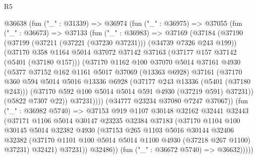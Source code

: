 \begin{lexlean}{R5}
\begin{coremodule}
      @36638
        (fun ("_" : @31339) =>
        @36974
          (fun ("_" : @36975) =>
          @37055
            (fun ("_" : @36673) =>
            @37133
              (fun ("_" : @36983) =>
              @37169
                (@37184
                  (@37190
                    (@37199 (@37211 (@37221 (@37230 @37231))) (@34739 @7326 @243 @199))
                    (@37170
                      @358
                      @1164
                      @5014
                      @37072
                      @37142
                      @37163
                      (@37177 @157 @37142 (@5401 (@37180 @157)))
                      (@37170
                        @1162
                        @100
                        @37070
                        @5014
                        @37161
                        @4930
                        (@5377
                          @37152
                          @162
                          @1161
                          @5017
                          @37069
                          (@13363 @6928)
                          @37161
                          (@37170
                            @360
                            @594
                            @5014
                            @5016
                            @13336
                            @6928
                            (@37177 @243 @13336 (@5401 (@37180 @243)))
                            (@37170 @592 @100 @5014 @5014 @591 @4930 (@37219 @591) @37231))
                          (@5822 @7307 @22))
                        @37231))))
                (@34777 @23234 @37080 @7247 @37067))
              (fun ("_" : @36982 @5740) =>
              @37153
                @919
                @1107
                @30148
                @32162
                @32441
                @32443
                (@37171
                  @1106
                  @5014
                  @30147
                  @23235
                  @32384
                  @37183
                  (@37170
                    @1104
                    @100
                    @30145
                    @5014
                    @32382
                    @4930
                    (@37153
                      @265
                      @1103
                      @5016
                      @30144
                      @32406
                      @32382
                      (@37170 @1101 @100 @5014 @5014 @1100 @4930 (@37218 @267 @1100) @37231)
                      @32421)
                    @37231))
                @32486))
            (fun ("_" : @36672 @5740) => @36632)))))

\end{coremodule}
\end{lexlean}

